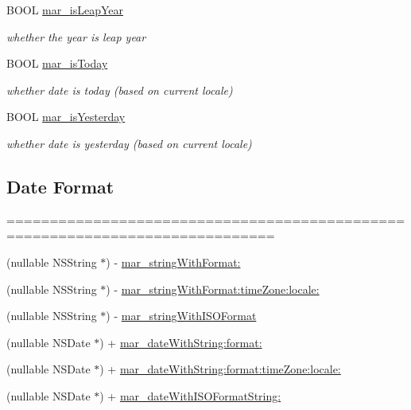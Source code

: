 \begin{Indent}
\begin{DoxyCompactItemize}
B\+O\+OL \hyperlink{category_n_s_date_07_m_a_r_e_x_08_aa2fba22a0103d5113842d3eb4746c6b1}{mar\+\_\+is\+Leap\+Year}
\begin{DoxyCompactList}\small\item\em whether the year is leap year \end{DoxyCompactList}\item 
B\+O\+OL \hyperlink{category_n_s_date_07_m_a_r_e_x_08_abac586cfa464a489c1eb913542fbfc82}{mar\+\_\+is\+Today}
\begin{DoxyCompactList}\small\item\em whether date is today (based on current locale) \end{DoxyCompactList}\item 
B\+O\+OL \hyperlink{category_n_s_date_07_m_a_r_e_x_08_a83f805b92ba8ae7f6ee871ddf6a782cc}{mar\+\_\+is\+Yesterday}
\begin{DoxyCompactList}\small\item\em whether date is yesterday (based on current locale) \end{DoxyCompactList}\end{DoxyCompactItemize}
\end{Indent}
\subsection*{Date Format}
\label{_amgrp8b6f6d305407f0b686f1974206ad415c}%
============================================================================= 

 \begin{DoxyCompactItemize}
\item 
(nullable N\+S\+String $\ast$) -\/ \hyperlink{category_n_s_date_07_m_a_r_e_x_08_abc31fcbf1979057b8298058d237c793a}{mar\+\_\+string\+With\+Format\+:}
\item 
(nullable N\+S\+String $\ast$) -\/ \hyperlink{category_n_s_date_07_m_a_r_e_x_08_a142fc462b64acafa6f8882c567da95bf}{mar\+\_\+string\+With\+Format\+:time\+Zone\+:locale\+:}
\item 
(nullable N\+S\+String $\ast$) -\/ \hyperlink{category_n_s_date_07_m_a_r_e_x_08_a14bde423f52e4a860aa746fa22f51023}{mar\+\_\+string\+With\+I\+S\+O\+Format}
\item 
(nullable N\+S\+Date $\ast$) + \hyperlink{category_n_s_date_07_m_a_r_e_x_08_a60ba70b89bb130aef960fbaf551d81ab}{mar\+\_\+date\+With\+String\+:format\+:}
\item 
(nullable N\+S\+Date $\ast$) + \hyperlink{category_n_s_date_07_m_a_r_e_x_08_a2f95ba56b6d5026130e5fc1c6e67b5e6}{mar\+\_\+date\+With\+String\+:format\+:time\+Zone\+:locale\+:}
\item 
(nullable N\+S\+Date $\ast$) + \hyperlink{category_n_s_date_07_m_a_r_e_x_08_ab215c93e1958da9cac1d131e107d1e07}{mar\+\_\+date\+With\+I\+S\+O\+Format\+String\+:}
\end{DoxyCompactItemize}


